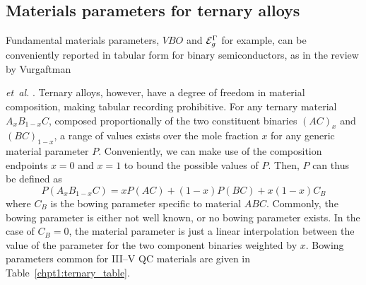 \subsection{Materials parameters for ternary alloys}

Fundamental materials parameters, $VBO$ and $\EE_g^\Gamma$ for example, can be conveniently reported in tabular form for binary semiconductors, as in the review by Vurgaftman {\emph{et~al.} \cite{Vurgaftman}.  Ternary alloys, however, have a degree of freedom in material composition, making tabular recording prohibitive.  For any ternary material $A_x B_{1-x} C$, composed proportionally of the two constituent binaries $(AC)_x$ and $(BC)_{1-x}$, a range of values exists over the mole fraction $x$ for any generic material parameter $P$.  Conveniently, we can make use of the composition endpoints $x=0$ and $x=1$ to bound the possible values of $P$.  Then, $P$ can thus be defined as
\begin{equation}
P(A_x B_{1-x} C) = x P(AC) + (1-x) P(BC) + x(1-x) C_B
\end{equation}
where $C_B$ is the bowing parameter specific to material $ABC$.  Commonly, the bowing parameter is either not well known, or no bowing parameter exists.  In the case of $C_B=0$, the material parameter is just a linear interpolation between the value of the parameter for the two component binaries weighted by $x$.  Bowing parameters common for III--V QC materials are given in Table~\ref{chpt1:ternary_table}.



}
